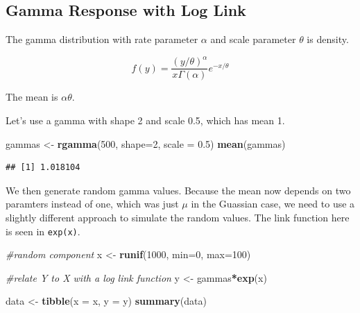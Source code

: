 \documentclass[
  openany]{book}
\newenvironment{Shaded}{\begin{snugshade}}{\end{snugshade}}
\newcommand{\CommentTok}[1]{\textcolor[rgb]{0.56,0.35,0.01}{\textit{#1}}}
\newcommand{\DataTypeTok}[1]{\textcolor[rgb]{0.13,0.29,0.53}{#1}}
\newcommand{\DecValTok}[1]{\textcolor[rgb]{0.00,0.00,0.81}{#1}}
\newcommand{\FloatTok}[1]{\textcolor[rgb]{0.00,0.00,0.81}{#1}}
\newcommand{\KeywordTok}[1]{\textcolor[rgb]{0.13,0.29,0.53}{\textbf{#1}}}
\newcommand{\NormalTok}[1]{#1}
\newcommand{\OperatorTok}[1]{\textcolor[rgb]{0.81,0.36,0.00}{\textbf{#1}}}
\newcommand{\StringTok}[1]{\textcolor[rgb]{0.31,0.60,0.02}{#1}}
\begin{document}
\hypertarget{gamma-response-with-log-link}{%
\subsection{Gamma Response with Log Link}\label{gamma-response-with-log-link}}

The gamma distribution with rate parameter \(\alpha\) and scale parameter \(\theta\) is density.

\[f(y) = \frac{(y/\theta)^\alpha}{x \Gamma(\alpha)}e^{-x/\theta}\]

The mean is \(\alpha\theta\).

Let's use a gamma with shape 2 and scale 0.5, which has mean 1.

\begin{Shaded}
\begin{Highlighting}[]
\NormalTok{gammas <-}\StringTok{ }\KeywordTok{rgamma}\NormalTok{(}\DecValTok{500}\NormalTok{, }\DataTypeTok{shape=}\DecValTok{2}\NormalTok{, }\DataTypeTok{scale =} \FloatTok{0.5}\NormalTok{)}
\KeywordTok{mean}\NormalTok{(gammas)}
\end{Highlighting}
\end{Shaded}

\begin{verbatim}
## [1] 1.018104
\end{verbatim}

We then generate random gamma values. Because the mean now depends on two paramters instead of one, which was just \(\mu\) in the Guassian case, we need to use a slightly different approach to simulate the random values. The link function here is seen in \texttt{exp(x)}.

\begin{Shaded}
\begin{Highlighting}[]
\CommentTok{#random component}
\NormalTok{x <-}\StringTok{ }\KeywordTok{runif}\NormalTok{(}\DecValTok{1000}\NormalTok{, }\DataTypeTok{min=}\DecValTok{0}\NormalTok{, }\DataTypeTok{max=}\DecValTok{100}\NormalTok{)}

\CommentTok{#relate Y to X with a log link function}
\NormalTok{y <-}\StringTok{ }\NormalTok{gammas}\OperatorTok{*}\KeywordTok{exp}\NormalTok{(x)}

\NormalTok{data <-}\StringTok{ }\KeywordTok{tibble}\NormalTok{(}\DataTypeTok{x =}\NormalTok{ x, }\DataTypeTok{y  =}\NormalTok{ y)}
\KeywordTok{summary}\NormalTok{(data)}
\end{Highlighting}
\end{Shaded}
\end{document}
